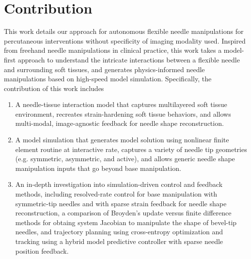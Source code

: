






\section{Contribution}
\label{sec:contribution}

This work details our approach for autonomous flexible needle manipulations for percutaneous interventions without specificity of imaging modality used. Inspired from freehand needle manipulations in clinical practice, this work takes a model-first approach to understand the intricate interactions between a flexible needle and surrounding soft tissues, and generates physics-informed needle manipulations based on high-speed model simulation. Specifically, the contribution of this work includes
\begin{enumerate}[label*=\arabic*.]
\item A needle-tissue interaction model that captures multilayered soft tissue environment, recreates strain-hardening soft tissue behaviors, and allows multi-modal, image-agnostic feedback for needle shape reconstruction.
\item A model simulation that generates model solution using nonlinear finite element routine at interactive rate, captures a variety of needle tip geometries (e.g. symmetric, asymmetric, and active), and allows generic needle shape manipulation inputs that go beyond base manipulation.
\item An in-depth investigation into simulation-driven control and feedback methods, including resolved-rate control for base manipulation with symmetric-tip needles and with sparse strain feedback for needle shape reconstruction, a comparison of Broyden's update versus finite difference methods for obtaing system Jacobian to manipulate the shape of bevel-tip needles, and trajectory planning using cross-entropy optimization and tracking using a hybrid model predictive controller with sparse needle position feedback.
\end{enumerate}

